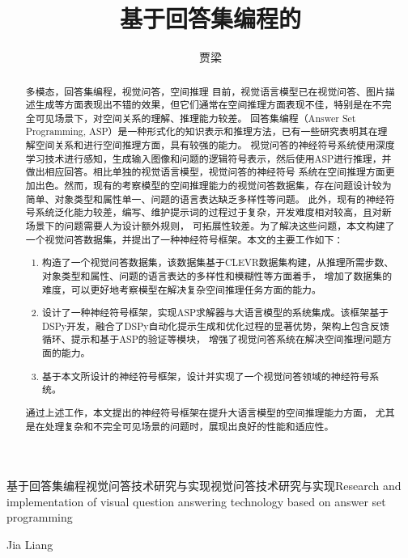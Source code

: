 \title{基于回答集编程的}{基于回答集编程}{视觉问答技术研究与实现}{视觉问答技术研究与实现}{Research and implementation of visual question answering technology }{based on answer set programming}
\author{贾梁}{Jia Liang}
\makebigcover
\makecover
\begin{abstract}{多模态，回答集编程，视觉问答，空间推理}
    目前，视觉语言模型已在视觉问答、图片描述生成等方面表现出不错的效果，但它们通常在空间推理方面表现不佳，特别是在不完全可见场景下，对空间关系的理解、推理能力较差。
    回答集编程（Answer Set Programming, ASP）是一种形式化的知识表示和推理方法，已有一些研究表明其在理解空间关系和进行空间推理方面，具有较强的能力。
    视觉问答的神经符号系统使用深度学习技术进行感知，生成输入图像和问题的逻辑符号表示，然后使用ASP进行推理，并做出相应回答。相比单独的视觉语言模型，视觉问答的神经符号
    系统在空间推理方面更加出色。然而，现有的考察模型的空间推理能力的视觉问答数据集，存在问题设计较为简单、对象类型和属性单一、问题的语言表达缺乏多样性等问题。
    此外，现有的神经符号系统泛化能力较差，编写、维护提示词的过程过于复杂，开发难度相对较高，且对新场景下的问题需要人为设计额外规则，
    可拓展性较差。为了解决这些问题，本文构建了一个视觉问答数据集，并提出了一种神经符号框架。本文的主要工作如下：
\begin{enumerate}[itemsep=0pt]
    \item 构造了一个视觉问答数据集，该数据集基于CLEVR数据集构建，从推理所需步数、对象类型和属性、问题的语言表达的多样性和模糊性等方面着手，
    增加了数据集的难度，可以更好地考察模型在解决复杂空间推理任务方面的能力。
    \item 设计了一种神经符号框架，实现ASP求解器与大语言模型的系统集成。该框架基于DSPy开发，融合了DSPy自动化提示生成和优化过程的显著优势，架构上包含反馈循环、提示和基于ASP的验证等模块，
增强了视觉问答系统在解决空间推理问题方面的能力。
    \item 基于本文所设计的神经符号框架，设计并实现了一个视觉问答领域的神经符号系统。
\end{enumerate}

通过上述工作，本文提出的神经符号框架在提升大语言模型的空间推理能力方面，
尤其是在处理复杂和不完全可见场景的问题时，展现出良好的性能和适应性。
    
\end{abstract}


